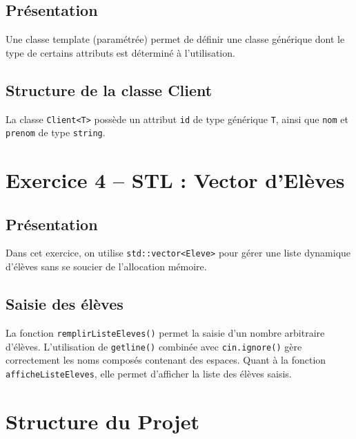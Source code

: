\documentclass[12pt,a4paper]{article}
\begin{document}
\subsection{Pr\'esentation}

Une classe template (param\'etr\'ee) permet de d\'efinir une classe g\'en\'erique
dont le type de certains attributs est d\'etermin\'e \`a l'utilisation.


\subsection{Structure de la classe Client}

La classe \texttt{Client<T>} poss\`ede un attribut \texttt{id} de type g\'en\'erique \texttt{T},
ainsi que \texttt{nom} et \texttt{prenom} de type \texttt{string}.


\section{Exercice 4 -- STL : Vector d'El\`eves}

\subsection{Pr\'esentation}

Dans cet exercice, on utilise \texttt{std::vector<Eleve>} pour g\'erer
une liste dynamique d'\'el\`eves sans se soucier de l'allocation m\'emoire.

\subsection{Saisie des \'el\`eves}

La fonction \texttt{remplirListeEleves()} permet la saisie d'un nombre arbitraire
d'\'el\`eves. L'utilisation de \texttt{getline()} combin\'ee avec \texttt{cin.ignore()}
g\`ere correctement les noms compos\'es contenant des espaces. Quant à la fonction \texttt{afficheListeEleves}, elle permet d'afficher la liste des élèves saisis.


\section{Structure du Projet}
\end{document}
